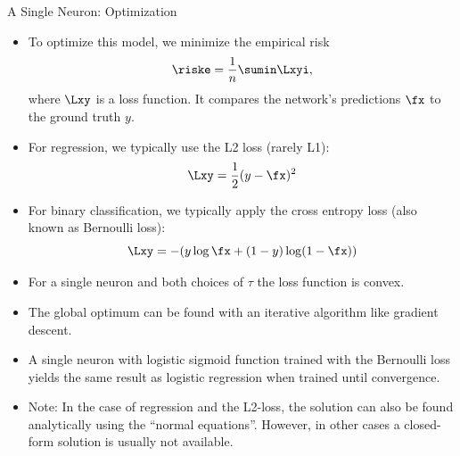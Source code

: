 \documentclass[11pt,compress,t,notes=noshow, xcolor=table]{beamer}
\begin{document}
\begin{vbframe} {A Single Neuron: Optimization}
\begin{itemize}
\item To optimize this model, we minimize the empirical risk 
$$\riske = \frac{1}{n} \sumin \Lxyi,$$
where $\Lxy$ is a loss function. It compares the network's predictions $\fx$ to the ground truth $y$. 
\item For regression, we typically use the L2 loss (rarely L1): $$\Lxy = \frac{1}{2}(y - \fx)^2$$
\item For binary classification, we typically apply the cross entropy loss (also known as Bernoulli loss): $$\Lxy = -(y \log \fx + (1 - y) \log(1 - \fx))$$
\framebreak 

\vspace{.5cm}
\item For a single neuron and both choices of $\tau$ the loss function is convex.
\item The global optimum can be found with an iterative algorithm like gradient descent. 
\item A single neuron with logistic sigmoid function trained with the Bernoulli loss %
 yields the %
 same result as logistic regression when trained until convergence.
\item Note: In the case of regression and the L2-loss, the solution can
also be found analytically using the “normal equations”. However, in other cases a closed-form solution is usually not available.
\end{itemize}
\end{vbframe} 

\endlecture
\end{document}
